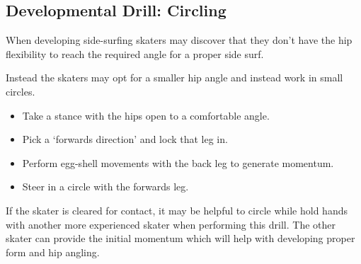 \subsection*{Developmental Drill: Circling}
\label{drill:side_surf/circle}

When developing side-surfing skaters may discover that they don't have the hip flexibility to reach the required angle for a proper side surf.   

Instead the skaters may opt for a smaller hip angle and instead work in small circles. 

\begin{itemize}
\item Take a stance with the hips open to a comfortable angle.
\item Pick a `forwards direction' and lock that leg in. 
\item Perform egg-shell movements with the back leg to generate momentum. 
\item Steer in a circle with the forwards leg.
\end{itemize}


If the skater is cleared for contact, it may be helpful to circle while hold hands with another more experienced skater when performing this drill.  
The other skater can provide the initial momentum which will help with developing proper form and hip angling.  


